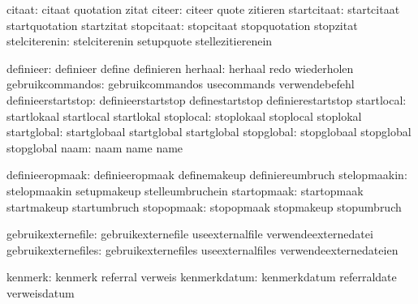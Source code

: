                        citaat:  citaat                       quotation
                                zitat
                       citeer:  citeer                       quote
                                zitieren
                  startcitaat:  startcitaat                  startquotation
                                startzitat
                   stopcitaat:  stopcitaat                   stopquotation
                                stopzitat
                stelciterenin:  stelciterenin                setupquote
                                stellezitierenein

                    definieer:  definieer                    define
                                definieren
                      herhaal:  herhaal                      redo
                                wiederholen
             gebruikcommandos:  gebruikcommandos             usecommands
                                verwendebefehl
           definieerstartstop:  definieerstartstop           definestartstop
                                definierestartstop
                   startlocal:  startlokaal                  startlocal
                                startlokal
                    stoplocal:  stoplokaal                   stoplocal
                                stoplokal
                  startglobal:  startglobaal                 startglobal
                                startglobal
                   stopglobal:  stopglobaal                  stopglobal
                                stopglobal
                         naam:  naam                         name
                                name

              definieeropmaak:  definieeropmaak              definemakeup
                                definiereumbruch
                 stelopmaakin:  stelopmaakin                 setupmakeup
                                stelleumbruchein
                  startopmaak:  startopmaak                  startmakeup
                                startumbruch
                   stopopmaak:  stopopmaak                   stopmakeup
                                stopumbruch
  
           gebruikexternefile:  gebruikexternefile           useexternalfile
                                verwendeexternedatei
          gebruikexternefiles:  gebruikexternefiles          useexternalfiles
                                verwendeexternedateien

                      kenmerk:  kenmerk                      referral
                                verweis
                 kenmerkdatum:  kenmerkdatum                 referraldate
                                verweisdatum

